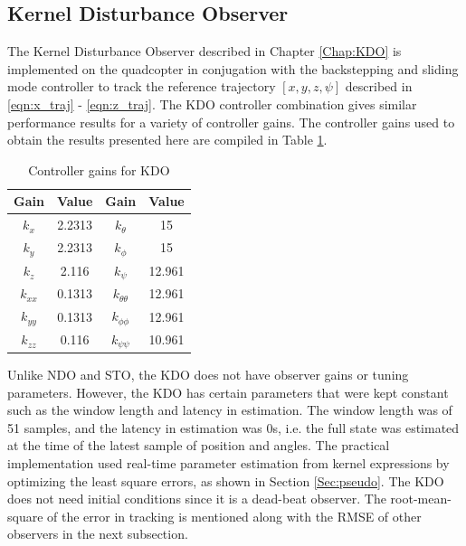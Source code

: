 \documentclass[letterpaper%
, twoside%
, 12pt%
,memoire%
, english%
,creativecommons,hyperref%
]{thETS}
\begin{document}
\FloatBarrier
\subsection{Kernel Disturbance Observer}
The Kernel Disturbance Observer described in Chapter \ref{Chap:KDO} is implemented on the quadcopter in conjugation with the backstepping and sliding mode controller to track the reference trajectory $[x,y,z,\psi]$ described in \eqref{eqn:x_traj} - \eqref{eqn:z_traj}. The KDO controller combination gives similar performance results for a variety of controller gains. The controller gains used to obtain the results presented here are compiled in Table \ref{Tab:realControllerGainsKDO}.

\begin{table}
\parbox{0.65\textwidth}{\caption{Controller gains for KDO}\label{Tab:realControllerGainsKDO}} 
\begin{tabular}{|c|c|c|c|}
\hline
{\bf Gain} & {\bf Value} & {\bf Gain}         & {\bf Value}  \\ \hline
$k_x$      & 2.2313      & $k_\theta$         & 15           \\ \hline
$k_y$      & 2.2313      & $k_\phi$           & 15           \\ \hline
$k_z$      & 2.116       & $k_\psi$           & 12.961       \\ \hline 
$k_{xx}$   & 0.1313      & $k_{\theta\theta}$ & 12.961       \\ \hline
$k_{yy}$   & 0.1313      & $k_{\phi\phi}$     & 12.961       \\ \hline
$k_{zz}$   & 0.116       & $k_{\psi\psi}$     & 10.961       \\ \hline 
\end{tabular}
\end{table}

Unlike NDO and STO, the KDO does not have observer gains or tuning parameters. However, the KDO has certain parameters that were kept constant such as the window length and latency in estimation. The window length was of 51 samples, and the latency in estimation was 0s, i.e. the full state was estimated at the time of the latest sample of position and angles. The practical implementation used real-time parameter estimation from kernel expressions by optimizing the least square errors, as shown in Section \ref{Sec:pseudo}. The KDO does not need initial conditions since it is a dead-beat observer. The root-mean-square of the error in tracking is mentioned along with the RMSE of other observers in the next subsection.
\end{document}
